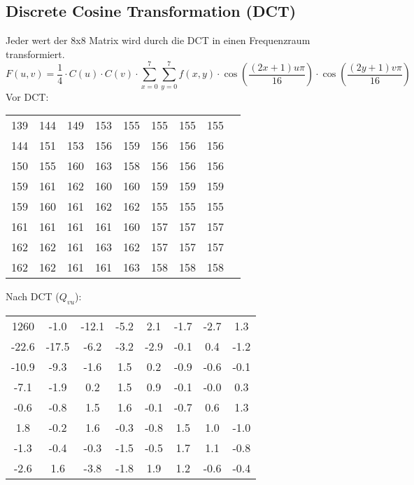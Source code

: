 \subsection{Discrete Cosine Transformation (DCT)}
Jeder wert der 8x8 Matrix wird durch die DCT in einen Frequenzraum transformiert.
\begin{equation*}
    F(u,v) = \frac{1}{4} \cdot C(u) \cdot C(v) \cdot \sum_{x=0}^{7} \sum_{y=0}^{7} f(x,y) \cdot \cos(\frac{(2x+1)u\pi}{16}) \cdot \cos(\frac{(2y+1)v\pi}{16})
\end{equation*}
Vor DCT:
\begin{center}
    \begin{tabular}{ c c c c c c c c c }
        139 & 144 & 149 & 153 & 155 & 155 & 155 & 155 \\
        144 & 151 & 153 & 156 & 159 & 156 & 156 & 156 \\
        150 & 155 & 160 & 163 & 158 & 156 & 156 & 156 \\
        159 & 161 & 162 & 160 & 160 & 159 & 159 & 159 \\
        159 & 160 & 161 & 162 & 162 & 155 & 155 & 155 \\
        161 & 161 & 161 & 161 & 160 & 157 & 157 & 157 \\
        162 & 162 & 161 & 163 & 162 & 157 & 157 & 157 \\
        162 & 162 & 161 & 161 & 163 & 158 & 158 & 158 \\
    \end{tabular}
\end{center}
Nach DCT ($Q_{vu}$):
\begin{center}
    \begin{tabular}{ c c c c c c c c }
        1260 & -1.0 & -12.1 & -5.2 & 2.1 & -1.7 & -2.7 & 1.3 \\
        -22.6 & -17.5 & -6.2 & -3.2 & -2.9 & -0.1 & 0.4 & -1.2 \\
        -10.9 & -9.3 & -1.6 & 1.5 & 0.2 & -0.9 & -0.6 & -0.1 \\
        -7.1 & -1.9 & 0.2 & 1.5 & 0.9 & -0.1 & -0.0 & 0.3 \\
        -0.6 & -0.8 & 1.5 & 1.6 & -0.1 & -0.7 & 0.6 & 1.3 \\
        1.8 & -0.2 & 1.6 & -0.3 & -0.8 & 1.5 & 1.0 & -1.0 \\
        -1.3 & -0.4 & -0.3 & -1.5 & -0.5 & 1.7 & 1.1 & -0.8 \\
        -2.6 & 1.6 & -3.8 & -1.8 & 1.9 & 1.2 & -0.6 & -0.4 \\
    \end{tabular}
\end{center}
